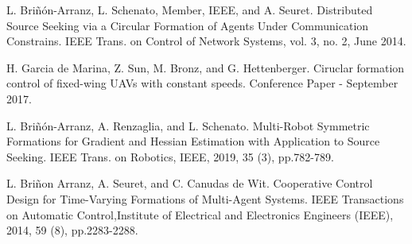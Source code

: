 \newpage
\thispagestyle{empty}
\mbox{}
\begin{thebibliography}{3}

L. Briñón-Arranz, L. Schenato, Member, IEEE, and A. Seuret. Distributed Source Seeking via a Circular Formation of Agents Under Communication Constrains. IEEE Trans. on Control of Network Systems, vol. 3, no. 2, June 2014.

H. Garcia de Marina, Z. Sun, M. Bronz, and G. Hettenberger. Ciruclar formation control of fixed-wing UAVs with constant speeds. Conference Paper - September 2017.

L. Briñón-Arranz, A. Renzaglia, and L. Schenato. Multi-Robot Symmetric Formations for Gradient and Hessian Estimation with Application to Source Seeking. IEEE Trans. on Robotics, IEEE, 2019, 35 (3), pp.782-789.

L. Briñon Arranz, A. Seuret, and C. Canudas de Wit. Cooperative Control Design for Time-Varying Formations of Multi-Agent Systems. IEEE Transactions on Automatic Control,Institute of Electrical and Electronics Engineers (IEEE), 2014, 59 (8), pp.2283-2288.



\end{thebibliography}
